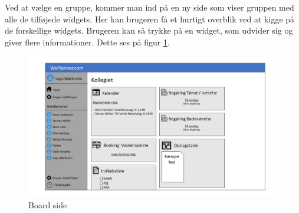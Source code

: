 \noindent Ved at vælge en gruppe, kommer man ind på en ny side som viser gruppen med alle de tilføjede widgets. Her kan brugeren få et hurtigt overblik ved at kigge på de forskellige widgets. Brugeren kan så trykke på en widget, som udvider sig og giver flere informationer. Dette ses på figur \ref{fig:board_site}.
\begin{figure}[H]
  \includegraphics[width=\linewidth]{Indledning/Images/Slide3.JPG}
  \caption{Board side}
  \label{fig:board_site}
\end{figure}